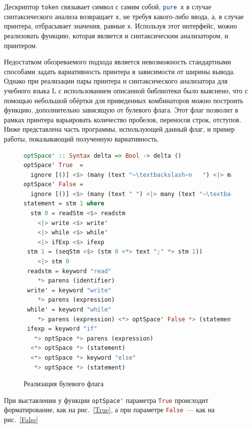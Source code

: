 Дескриптор \lstinline[language=Haskell]{token} связывает символ с самим собой, \lstinline[language=Haskell]{pure x} 
в случае синтаксического анализа возвращает \lstinline[language=Haskell]{x}, не требуя какого-либо ввода, а, в случае 
принтера, отбрасывает значения, равные \lstinline[language=Haskell]{x}. Используя этот интерфейс, можно 
реализовать функцию, которая является и синтаксическим анализатором, и принтером.

Недостатком обозреваемого подхода является невозможность стандартными способами задать 
вариативность принтера в зависимости от ширины вывода. 
Однако при реализации пары принтера и синтаксического анализатора для учебного языка L с использованием
описанной библиотеки было выяснено, что с помощью небольшой обёртки для приведенных
комбинаторов можно построить функцию, дополнительно зависящую от 
булевого флага. Этот флаг позволит в рамках принтера варьировать количество пробелов, переносов строк, отступов.
Ниже представлена часть программы, использующей данный флаг, и пример работы, показывающий
полученную вариативность.

\begin{figure}[ht]
\centering
\begin{lstlisting}[language=Haskell]
optSpace' :: Syntax delta => Bool -> delta ()
optSpace' True  = 
  ignore [()] <$> (many (text "~\textbackslash~n   ") <|> many (text " "))
optSpace' False = 
  ignore [()] <$> (many (text " ") <|> many (text "~\textbackslash~n"))
statement = stm 1 where
  stm 0 = readStm <$> readstm
    <|> write <$> write'
    <|> while <$> while'
    <|> ifExp <$> ifexp
 stm 1 = (seqStm <$> (stm 0 <*> text ";" *> stm 1))
    <|> stm 0
 readstm = keyword "read"
    *> parens (identifier)
 write' = keyword "write"		  
    *> parens (expression)
 while' = keyword "while"
    *> parens (expression) <*> optSpace' False *> (statement)
 ifexp = keyword "if"
   *> optSpace *> parens (expression)
  <*> optSpace *> (statement) 
  <*> optSpace *> keyword "else"  
   *> optSpace *> (statement)	
\end{lstlisting}
\caption{Реализация булевого флага}
\label{boolFlag1}
\end{figure}

При выставлении у функции \lstinline[language=Haskell]{optSpace'} параметра 
\lstinline[language=Haskell]{True} происходит форматирование, как на рис.~\ref{True}, 
а при параметре \lstinline[language=Haskell]{False}~--- как на рис.~\ref{False}

